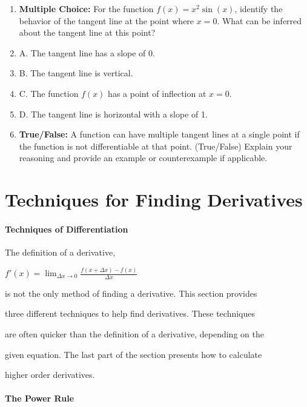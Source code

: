 {{{{\begin{enumerate}
    \item \textbf{Multiple Choice:} For the function $f(x) = x^2 \sin(x)$, identify the behavior of the tangent line at the point where $x = 0$. What can be inferred about the tangent line at this point?
    \item A. The tangent line has a slope of 0.
    \item B. The tangent line is vertical.
    \item C. The function $f(x)$ has a point of inflection at $x = 0$.
    \item D. The tangent line is horizontal with a slope of 1.
    \item \textbf{True/False:} A function can have multiple tangent lines at a single point if the function is not differentiable at that point. (True/False) Explain your reasoning and provide an example or counterexample if applicable.
\end{enumerate}

\section{Techniques for Finding Derivatives}
\label{sec:techniques-for-finding-derivatives}

\paragraph{Techniques of Differentiation}



The definition of a derivative,

$f'(x)=\lim_{{\Delta}x\rightarrow 0} \frac{f(x+{\Delta}x)-f(x)}{{\Delta}x}$

is not the only method of finding a derivative. This section provides

three different techniques to help find derivatives. These techniques

are often quicker than the definition of a derivative, depending on the

given equation. The last part of the section presents how to calculate

higher order derivatives.



\paragraph{The Power Rule}



}}}}
